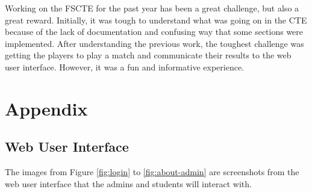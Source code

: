 \documentclass[a4paper, 12pt]{report}
\begin{document}
Working on the FSCTE for the past year has been a great challenge, but also a
great reward. Initially, it was tough to understand what was going on in the CTE
because of the lack of documentation and confusing way that some sections were
implemented. After understanding the previous work, the toughest challenge was
getting the players to play a match and communicate their results to the web
user interface. However, it was a fun and informative experience.

\chapter{Appendix}

\section{Web User Interface}

The images from Figure \ref{fig:login} to \ref{fig:about-admin} are screenshots
from the web user interface that the admins and students will interact with.
\vspace{0.4cm}
\end{document}

